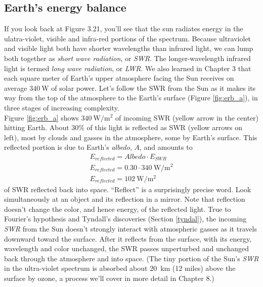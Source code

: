 \subsection{Earth's energy balance}\label{ghe_1}
If you look back at Figure 3.21, you'll see that the sun radiates energy in the ulatra-violet, visible and infra-red portions of the spectrum. Because ultraviolet and visible light both have shorter wavelengths than infrared light, we can lump both together as \textit{short wave radiation}, or \textit{SWR}. The longer-wavelength infrared light is termed \textit{long wave radiation}, or \textit{LWR}. We also learned in Chapter 3 that each square meter of Earth's upper atmosphere facing the Sun receives on average $\SI{340}{\watt}$ of solar power.  Let's follow the SWR from the Sun as it makes its way from the top of the atmosphere to the Earth's surface (Figure \ref{fig:erb_a}), in three stages of increasing complexity.\\ 
Figure \ref{fig:erb_a} shows $\SI{340}{\watt\per\m^{2}}$ of incoming SWR (yellow arrow in the center) hitting Earth. About 30\% of this light is reflected as SWR (yellow arrows on left), most by clouds and gasses in the atmosphere, some by Earth's surface. This reflected portion is due to Earth's \emph{albedo}, $A$, and amounts to
\begin{align}
	E_{reflected}=Albedo\cdot E_{SWR}\\
	E_{reflected}=0.30\cdot \SI{340}{\watt\per\m^{2}}\\ \label{eq:eref}
	E_{reflected}=\SI{102}{\watt\per\m^{2}}
\end{align}
of SWR reflected back into space. ``Reflect'' is a surprisingly precise word. Look simultaneously at an object and its reflection in a mirror. Note that reflection doesn't change the color, and hence energy, of the reflected light. True to Fourier's hypothesis and Tyndall's discoveries (Section \ref{tyndal}), the incoming \textit{SWR} from the Sun doesn't strongly interact with atmospheric gasses as it travels downward toward the surface. After it reflects from the surface, with its energy, wavelength and color unchanged, the SWR passes unperturbed and unchanged back through the atmosphere and into space. (The tiny portion of the Sun's \textit{SWR} in the ultra-violet spectrum is absorbed about \SI{20}{\kilo\metre} (12 miles) above the surface by ozone, a process we'll cover in more detail in Chapter 8.)\\
 
